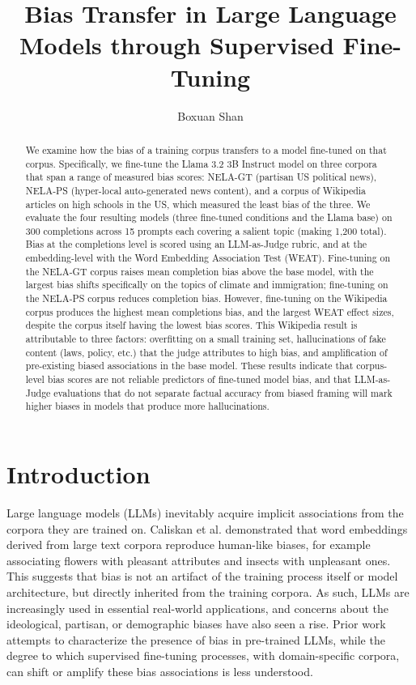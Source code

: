 \documentclass{article}
\title{Bias Transfer in Large Language Models through Supervised Fine-Tuning}
\author{Boxuan Shan}
\begin{document}
\maketitle

\begin{abstract}

  We examine how the bias of a training corpus transfers to a model fine-tuned on that corpus. 
  Specifically, we fine-tune the Llama 3.2 3B Instruct model on three corpora that span a range of measured bias scores: NELA-GT (partisan US political news), NELA-PS (hyper-local auto-generated news content), and a corpus of Wikipedia articles on high schools in the US, which measured the least bias of the three.  
  We evaluate the four resulting models (three fine-tuned conditions and the Llama base) on 300 completions across 15 prompts each covering a salient topic (making 1{,}200 total). 
  Bias at the completions level is scored using an LLM-as-Judge rubric, and at the embedding-level with the Word Embedding Association Test (WEAT). 
  Fine-tuning on the NELA-GT corpus raises mean completion bias above the base model, with the largest bias shifts specifically on the topics of climate and immigration; fine-tuning on the NELA-PS corpus reduces completion bias. 
  However, fine-tuning on the Wikipedia corpus produces the highest mean completions bias, and the largest WEAT effect sizes, despite the corpus itself having the lowest bias scores.
  This Wikipedia result is attributable to three factors: overfitting on a small training set, hallucinations of fake content (laws, policy, etc.) that the judge attributes to high bias, and amplification of pre-existing biased associations in the base model. 
  These results indicate that corpus-level bias scores are not reliable predictors of fine-tuned model bias, and that LLM-as-Judge evaluations that do not separate factual accuracy from biased framing will mark higher biases in models that produce more hallucinations. 
\end{abstract}

\section{Introduction}

Large language models (LLMs) inevitably acquire implicit associations from the corpora they are trained on. 
Caliskan et al. \cite{caliskan2017} demonstrated that word embeddings derived from large text corpora reproduce human-like biases, for example associating flowers with pleasant attributes and insects with unpleasant ones. 
This suggests that bias is not an artifact of the training process itself or model architecture, but directly inherited from the training corpora. 
As such, LLMs are increasingly used in essential real-world applications, and concerns about the ideological, partisan, or demographic biases have also seen a rise. 
Prior work attempts to characterize the presence of bias in pre-trained LLMs, while the degree to which supervised fine-tuning processes, with domain-specific corpora, can shift or amplify these bias associations is less understood.  
\end{document}
